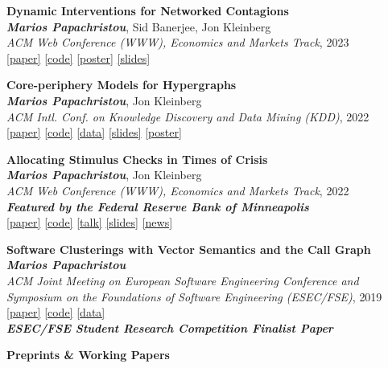 \documentclass[margin]{res}
\newcommand{\field}[2]{\noindent \textbf{#1} \hfill #2 \\}
\newcommand{\specialurl}[2]{\href {#2} {{{[#1]}}}}
\newcommand{\code}[1]{\specialurl {code} {#1}}
\newcommand{\data}[1]{\specialurl {data} {#1}}
\newcommand{\talk}[1]{\specialurl {talk} {#1}}
\newcommand{\slides}[1]{\specialurl {slides} {#1}}
\newcommand{\poster}[1]{\specialurl {poster} {#1}}
\newcommand{\paper}[1]{\specialurl {paper} {#1}}
\newcommand{\authorref}[1]{{\textit{\textbf{#1}}}}
\newcommand{\news}[1]{\specialurl {news} {#1}}
\newcommand{\authorme}{\authorref{Marios Papachristou}}
\newcommand{\bemph}[1]{\textbf{\emph{#1}}}
\newcommand{\publication}[5]{\textbf{#1}\\{#2}\\\emph{#3}, {#4}\\{#5}\smallskip}
\begin{document}
\begin{resume}
{\begin{enumerate}[nosep, label={[C\arabic*]}]
   \item \publication{Dynamic Interventions for Networked Contagions}{\authorme, Sid Banerjee, Jon Kleinberg}{ACM Web Conference (WWW), Economics and Markets Track}{2023}{\paper{https://dl.acm.org/doi/abs/10.1145/3543507.3583470} \code{https://github.com/papachristoumarios/dynamic-clearing} \poster{https://drive.google.com/file/d/1l0TCsoZNo3NoOOHsPSh1ofctXD4ivFir/view?usp=sharing}
		\slides{https://drive.google.com/file/d/1ZZ6F6PFNsBjYKFyurkwM2IbenuzXJEAs/view?usp=share_link}}

   \item \publication{Core-periphery Models for Hypergraphs}{\authorme, Jon Kleinberg}{ACM Intl. Conf. on Knowledge Discovery and Data Mining (KDD)}{2022}{\paper{https://arxiv.org/abs/2206.00783} \code{https://doi.org/10.5281/zenodo.5965849} \data{https://doi.org/10.5281/zenodo.5943043} \slides{https://drive.google.com/file/d/1k9pjPaeDtg7jhUivjlEmyunimcUb-DxL/view?usp=sharing} \poster{https://drive.google.com/file/d/1RJ3C7KKhTemfj5OBAiEXUHMVp-TJhTDs/view?usp=sharing}}
   \item \publication{Allocating Stimulus Checks in Times of Crisis}{\authorme, Jon Kleinberg}{ACM Web Conference (WWW), Economics and Markets Track}{2022}{\bemph{Featured by the Federal Reserve Bank of Minneapolis} \\ \paper{https://doi.org/10.1145/3485447.3512047} \code{https://github.com/papachristoumarios/financial-contagion}  \talk{https://youtu.be/WUmPBztK8Mo} \slides{https://drive.google.com/file/d/1v4v4jPOTzFtP8a5dhAFLoIjZSRDxAjBz/view?usp=sharing} \news{https://www.minneapolisfed.org/article/2022/social-policy-in-the-age-of-algorithms-an-interview-with-jon-kleinberg}}   
      \item \publication{Software Clusterings with Vector Semantics and the Call Graph}{\authorme}{ACM Joint Meeting on European Software Engineering Conference and Symposium on the Foundations of Software Engineering (ESEC/FSE)}{2019}{\paper{https://dl.acm.org/citation.cfm?id=3342483} \code{https://github.com/papachristoumarios/sade} \data{http://doi.org/10.5281/zenodo.2652487} \\\textbf{\emph{ESEC/FSE Student Research Competition Finalist Paper}}}
    
\end{enumerate}}


\field{Preprints \& Working Papers}{}{
\begin{enumerate}[nosep, label={[WP\arabic*]}]  


\end{enumerate}}
\end{resume}
\end{document}
